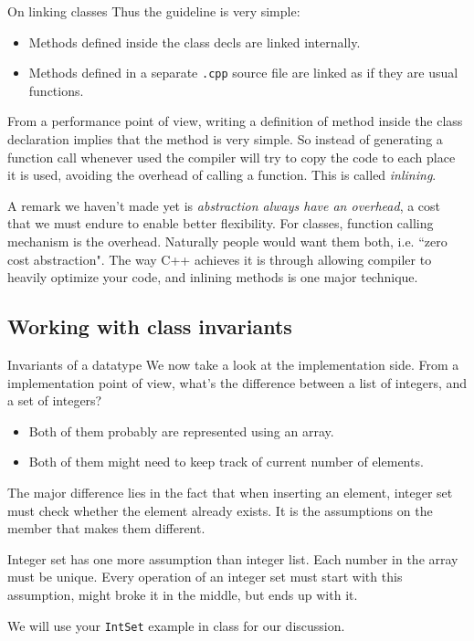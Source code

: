 \begin{frame}{On linking classes}
Thus the guideline is very simple:
\begin{itemize}
	\item Methods defined inside the class decls are linked internally.
	\item Methods defined in a separate \texttt{.cpp} source file are linked as if they are usual functions.
\end{itemize}
From a performance point of view, writing a definition of method inside the class declaration implies that the method is very simple. So instead of generating a function call whenever used the compiler will try to copy the code to each place it is used, avoiding the overhead of calling a function. This is called \textit{inlining}. 

\vspace{0.05in}
A remark we haven't made yet is \textit{abstraction always have an overhead}, a cost that we must endure to enable better flexibility. For classes, function calling mechanism is the overhead. Naturally people would want them both, i.e. ``zero cost abstraction". The way C++ achieves it is through allowing compiler to heavily optimize your code, and inlining methods is one major technique.
\end{frame}

\subsection{Working with class invariants}	
\begin{frame}{Invariants of a datatype}
We now take a look at the implementation side. From a implementation point of view, what's the difference between a list of integers, and a set of integers? 
\begin{itemize}
	\item Both of them probably are represented using an array.
	\item Both of them might need to keep track of current number of elements. 
\end{itemize} 
The major difference lies in the fact that when inserting an element, integer set must check whether the element already exists. It is the assumptions on the member that makes them different.

\vspace{0.05in}
Integer set has one more assumption than integer list. Each number in the array must be unique. Every operation of an integer set must start with this assumption, might broke it in the middle, but ends up with it.

\vspace{0.05in}
We will use your \texttt{IntSet} example in class for our discussion.
\end{frame}


